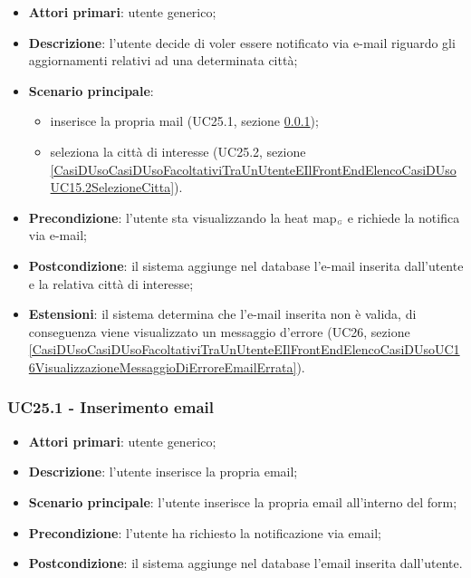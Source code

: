 \begin{itemize}
	\item \textbf{Attori primari}: utente generico;
	\item \textbf{Descrizione}: l'utente decide di voler essere notificato via e-mail riguardo gli aggiornamenti relativi ad una determinata città;
	\item \textbf{Scenario principale}:
		\begin{itemize}
			\item inserisce la propria mail (UC25.1, sezione \ref{CasiDUsoCasiDUsoFacoltativiTraUnUtenteEIlFrontEndElencoCasiDUsoUC15.1InserimentoEmail});
			\item seleziona la città di interesse (UC25.2, sezione \ref{CasiDUsoCasiDUsoFacoltativiTraUnUtenteEIlFrontEndElencoCasiDUsoUC15.2SelezioneCitta}).
		\end{itemize}
	\item \textbf{Precondizione}: l'utente sta visualizzando la heat map$_{\scaleto{G}{3pt}}$ e richiede la notifica via e-mail;
	\item \textbf{Postcondizione}: il sistema aggiunge nel database l'e-mail inserita dall'utente e la relativa città di interesse;
	\item \textbf{Estensioni}: il sistema determina che l'e-mail inserita non è valida, di conseguenza viene visualizzato un messaggio d'errore (UC26, sezione \ref{CasiDUsoCasiDUsoFacoltativiTraUnUtenteEIlFrontEndElencoCasiDUsoUC16VisualizzazioneMessaggioDiErroreEmailErrata}).
\end{itemize}

\subsubsection{UC25.1 - Inserimento email}\label{CasiDUsoCasiDUsoFacoltativiTraUnUtenteEIlFrontEndElencoCasiDUsoUC15.1InserimentoEmail}

\begin{itemize}
	\item \textbf{Attori primari}: utente generico;
	\item \textbf{Descrizione}: l'utente inserisce la propria email;
	\item \textbf{Scenario principale}: l'utente inserisce la propria email all'interno del form;
	\item \textbf{Precondizione}: l'utente ha richiesto la notificazione via email;
	\item \textbf{Postcondizione}: il sistema aggiunge nel database l'email inserita dall'utente.
\end{itemize}

